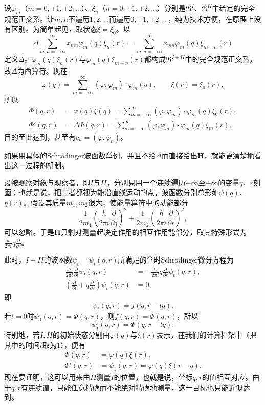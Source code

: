 \documentclass[fontsize=13pt,twoside,openany,headings=normal,parskip=false,bookmarkpackage=false,DIV=calc]{scrbook}
\begin{document}
设$\varphi_m$（$m=0,\allowbreak \pm1,\allowbreak \pm2,\allowbreak \ldots$）、$\xi_n$（$n=0,\allowbreak \pm1,\allowbreak \pm2,\allowbreak \ldots$）分别是$\mathfrak R^I$、$\mathfrak R^{II}$中给定的完全规范正交系。让$m,\allowbreak n$不遍历$1,\allowbreak 2,\allowbreak \ldots$而遍历$0,\allowbreak \pm1,\allowbreak \pm2,\allowbreak \ldots$，纯为技术方便，在原理上没有区别。为简单起见，取状态$\xi=\xi_0$。以
\[
 \Delta\sum_{m,n=-\infty}^{\infty}x_{mn}\varphi_m(q)\xi_n(r)
 =\sum_{m,n=-\infty}^{\infty}x_{mn}\varphi_m(q)\xi_{m+n}(r)
\]
定义$\Delta$。$\varphi_m(q)\xi_n(r)$与$\varphi_m(q)\xi_{m+n}(r)$都构成$\mathfrak R^{I+II}$中的完全规范正交系，故$\Delta$为酉算符。现在
\[
 \varphi(q)=\sum_{m=-\infty}^{\infty}(\varphi,\varphi_m)\cdot\varphi_m(q),\qquad
 \xi(r)=\xi_0(r),
\]
所以
\begin{align*}
 \Phi(q,r)&=\varphi(q)\xi(q)
 =\sum_{m=-\infty}^{\infty}(\varphi,\varphi_m)\cdot\varphi_m(q)\xi_0(r),\\
 \Phi'(q,r)&=\Delta\Phi(q,r)
 =\sum_{m=-\infty}^{\infty}(\varphi,\varphi_m)\cdot\varphi_m(q)\xi_m(r).
\end{align*}
目的至此达到，甚至有$c_n=(\varphi,\allowbreak \varphi_n)$。

\hypertarget{origpage-236}{}\label{origpage-236}如果用具体的Schrödinger波函数举例，并且不给$\Delta$而直接给出$\boldsymbol H$，就能更清楚地看出这一过程的机制。

设被观察对象与观察者，即$I$与$II$，分别只用一个连续遍历$-\infty$至$+\infty$的变量$q$、$r$刻画；也就是说，把二者都视为能沿直线运动的点，波函数分别总形如$\psi(q)$、$\eta(r)$。假设其质量$m_1,\allowbreak m_2$很大，使能量算符中的动能部分
\[
 \frac{1}{2m_1}\left(\frac{h}{2\pi i}\frac{\partial}{\partial q}\right)^2
 +\frac{1}{2m_2}\left(\frac{h}{2\pi i}\frac{\partial}{\partial r}\right)^2,
\]
可以忽略。于是$\boldsymbol H$只剩对测量起决定作用的相互作用能部分，取其特殊形式为$\frac{h}{2\pi i}q\frac{\partial}{\partial r}$。

此时，$I+II$的波函数$\psi_t=\psi_t(q,\allowbreak r)$所满足的含时Schrödinger微分方程为
\begin{align*}
 \frac{h}{2\pi i}\frac{\partial}{\partial t}\psi_t(q,r)
 &=-\frac{h}{2\pi i}q\frac{\partial}{\partial r}\psi_t(q,r),\\
 \left(\frac{\partial}{\partial t}+q\frac{\partial}{\partial r}\right)\psi_t(q,r)&=0,
\end{align*}
即
\[
 \psi_t(q,r)=f(q,r-tq).
\]
若$t=0$时$\psi_0(q,\allowbreak r)=\Phi(q,\allowbreak r)$，则$f(q,\allowbreak r)=\Phi(q,\allowbreak r)$，所以
\[
 \psi_t(q,r)=\Phi(q,r-tq).
\]
特别地，若$I,\allowbreak II$的初始状态分别由$\varphi(q)$与$\xi(r)$表示，在我们的计算框架中（把其中的时间$t$取为$1$），便有
\begin{align*}
 \Phi(q,r)&=\varphi(q)\xi(r),\\
 \Phi'(q,r)&=\psi_1(q,r)=\varphi(q)\xi(r-q).
\end{align*}
现在要证明，这可以用来由$II$测量$I$的位置，也就是说，坐标$q,\allowbreak r$的值相互对应。由于$q,\allowbreak r$有连续谱，只能任意精确而不能绝对精确地测量，这一目标也只能近似达到。
\end{document}
